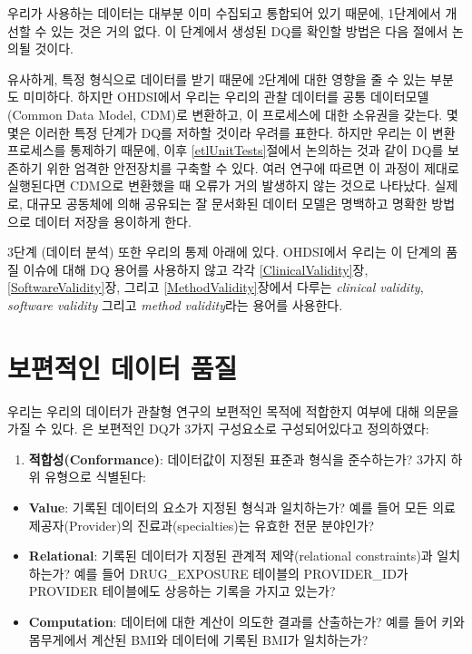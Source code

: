 \documentclass[11pt]{book}
\providecommand{\tightlist}{%
  \setlength{\itemsep}{0pt}\setlength{\parskip}{0pt}}
\theoremstyle{definition}
\theoremstyle{definition}
\theoremstyle{definition}
\theoremstyle{remark}
\begin{document}
우리가 사용하는 데이터는 대부분 이미 수집되고 통합되어 있기 때문에,
1단계에서 개선할 수 있는 것은 거의 없다. 이 단계에서 생성된 DQ를 확인할
방법은 다음 절에서 논의될 것이다.

유사하게, 특정 형식으로 데이터를 받기 때문에 2단계에 대한 영향을 줄 수
있는 부분도 미미하다. 하지만 OHDSI에서 우리는 우리의 관찰 데이터를 공통
데이터모델(Common Data Model, CDM)로 변환하고, 이 프로세스에 대한
소유권을 갖는다. 몇몇은 이러한 특정 단계가 DQ를 저하할 것이라 우려를
표한다. 하지만 우리는 이 변환 프로세스를 통제하기 때문에, 이후
\ref{etlUnitTests}절에서 논의하는 것과 같이 DQ를 보존하기 위한 엄격한
안전장치를 구축할 수 있다. 여러
연구\citep{defalco_2013, makadia_2014, matcho_2014, voss_2015, voss_2015b, hripcsak_2018}에
따르면 이 과정이 제대로 실행된다면 CDM으로 변환했을 때 오류가 거의
발생하지 않는 것으로 나타났다. 실제로, 대규모 공동체에 의해 공유되는 잘
문서화된 데이터 모델은 명백하고 명확한 방법으로 데이터 저장을 용이하게
한다.

3단계 (데이터 분석) 또한 우리의 통제 아래에 있다. OHDSI에서 우리는 이
단계의 품질 이슈에 대해 DQ 용어를 사용하지 않고 각각
\ref{ClinicalValidity}장, \ref{SoftwareValidity}장, 그리고
\ref{MethodValidity}장에서 다루는 \emph{clinical validity},
\emph{software validity} 그리고 \emph{method validity}라는 용어를
사용한다.

\section{보편적인 데이터 품질}\label{--}

우리는 우리의 데이터가 관찰형 연구의 보편적인 목적에 적합한지 여부에
대해 의문을 가질 수 있다. \citet{kahn_harmonized_2016} 은 보편적인 DQ가
3가지 구성요소로 구성되어있다고 정의하였다:

\begin{enumerate}
\def\labelenumi{\arabic{enumi}.}
\tightlist
\item
  \textbf{적합성(Conformance)}: 데이터값이 지정된 표준과 형식을
  준수하는가? 3가지 하위 유형으로 식별된다:
\end{enumerate}

\begin{itemize}
\tightlist
\item
  \textbf{Value}: 기록된 데이터의 요소가 지정된 형식과 일치하는가? 예를
  들어 모든 의료 제공자(Provider)의 진료과(specialties)는 유효한 전문
  분야인가?
\item
  \textbf{Relational}: 기록된 데이터가 지정된 관계적 제약(relational
  constraints)과 일치하는가? 예를 들어 DRUG\_EXPOSURE 테이블의
  PROVIDER\_ID가 PROVIDER 테이블에도 상응하는 기록을 가지고 있는가?
\item
  \textbf{Computation}: 데이터에 대한 계산이 의도한 결과를 산출하는가?
  예를 들어 키와 몸무게에서 계산된 BMI와 데이터에 기록된 BMI가
  일치하는가?
\end{itemize}
\end{document}
